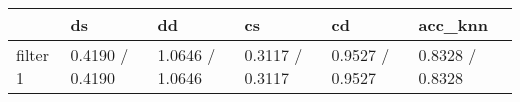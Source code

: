 \begin{tabular}{llllll}
\toprule
{} &               ds &               dd &               cs &               cd &          acc\_knn \\
\midrule
filter 1 &  0.4190 / 0.4190 &  1.0646 / 1.0646 &  0.3117 / 0.3117 &  0.9527 / 0.9527 &  0.8328 / 0.8328 \\
\bottomrule
\end{tabular}
